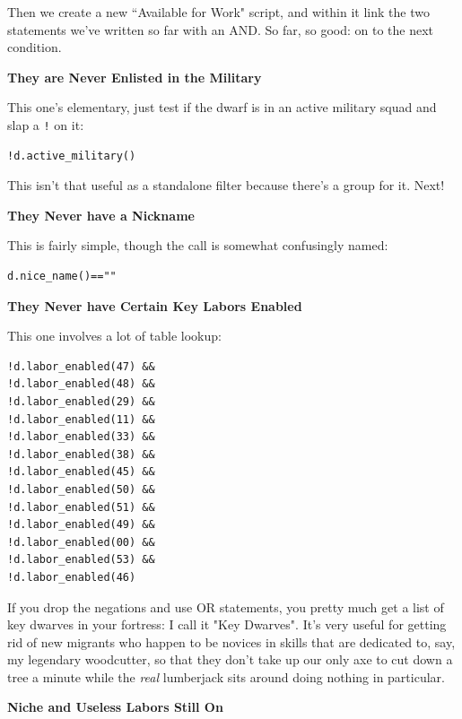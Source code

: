 \documentclass[]{article}
\begin{document}
Then we create a new ``Available for Work" script, and within it link the two statements we've written so
far with an AND. So far, so good: on to the next condition.
\vspace{12pt}

\textbf{They are Never Enlisted in the Military}

This one's elementary, just test if the dwarf is in an active military squad and slap a \texttt{!} on it:
\begin{verbatim}
!d.active_military()
\end{verbatim}

This isn't that useful as a standalone filter because there's a group for it. Next!
\vspace{12pt}

\textbf{They Never have a Nickname}

This is fairly simple, though the call is somewhat confusingly named:

\begin{verbatim}
d.nice_name()==""
\end{verbatim}

\vspace{12pt}

\textbf{They Never have Certain Key Labors Enabled}

This one involves a lot of table lookup:
\begin{multicols}{3}
\begin{verbatim}
!d.labor_enabled(47) &&
!d.labor_enabled(48) &&
!d.labor_enabled(29) &&
!d.labor_enabled(11) &&
!d.labor_enabled(33) &&
!d.labor_enabled(38) &&
!d.labor_enabled(45) &&
!d.labor_enabled(50) &&
!d.labor_enabled(51) &&
!d.labor_enabled(49) &&
!d.labor_enabled(00) &&
!d.labor_enabled(53) &&
!d.labor_enabled(46)
\end{verbatim}
\end{multicols}

If you drop the negations and use OR statements, you pretty much get a list of key dwarves in your
fortress: I call it "Key Dwarves". It's very useful for getting rid of new migrants who happen to be
novices in skills that are dedicated to, say, my legendary woodcutter, so that they don't take up our
only axe to cut down a tree a minute while the \emph{real} lumberjack sits around doing nothing in
particular.
\vspace{12pt}

\textbf{Niche and Useless Labors Still On}
\end{document}

